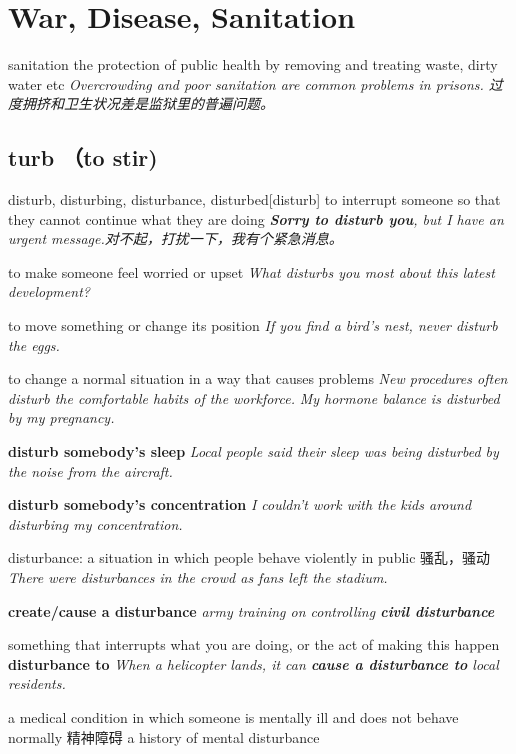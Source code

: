\chapter{War, Disease, Sanitation}

\begin{RefWord}{sanitation}
    the protection of public health by removing and treating waste, dirty water etc
    \textit{Overcrowding and poor sanitation are common problems in prisons. 过度拥挤和卫生状况差是监狱里的普遍问题。}
\end{RefWord}

\section{turb （to stir)}

\begin{DefWord}{disturb, disturbing, disturbance, disturbed}[disturb]
    to interrupt someone so that they cannot continue what they are doing
    \textit{\textbf{Sorry to disturb you}, but I have an urgent message.对不起，打扰一下，我有个紧急消息。}

    to make someone feel worried or upset
    \textit{What disturbs you most about this latest development?}

    to move something or change its position
    \textit{If you find a bird's nest, never disturb the eggs.}

    to change a normal situation in a way that causes problems
    \textit{New procedures often disturb the comfortable habits of the workforce.}
    \textit{My hormone balance is disturbed by my pregnancy.}


    \textbf{disturb somebody's sleep}
    \textit{Local people said their sleep was being disturbed by the noise from the aircraft.}

    \textbf{disturb somebody's concentration}
    \textit{I couldn't work with the kids around disturbing my concentration.}

    disturbance: a situation in which people behave violently in public 骚乱，骚动
    \textit{There were disturbances in the crowd as fans left the stadium.}

    \textbf{create/cause a disturbance}
    \textit{army training on controlling \textbf{civil disturbance}}

    something that interrupts what you are doing, or the act of making this happen
    \textbf{disturbance to}
    \textit{When a helicopter lands, it can \textbf{cause a disturbance to} local residents.}

    a medical condition in which someone is mentally ill and does not behave normally 精神障碍
    a history of mental disturbance


\end{DefWord}

